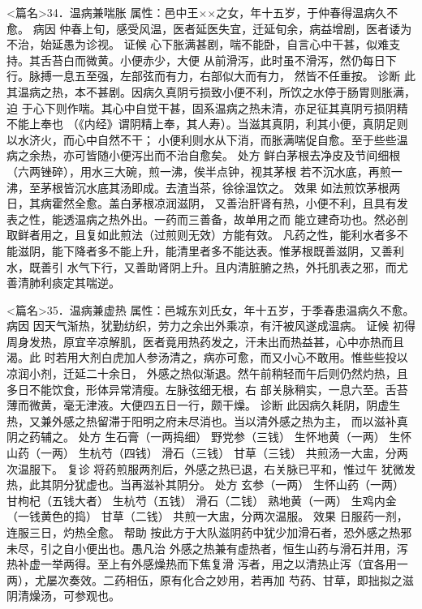 \documentclass[a4paper,12pt,UTF8,twoside]{ctexbook}
\begin{document}
<篇名>34．温病兼喘胀
属性：邑中王××之女，年十五岁，于仲春得温病久不愈。 
病因 仲春上旬，感受风温，医者延医失宜，迁延旬余，病益增剧，医者诿为不治，始延愚为诊视。 
证候 心下胀满甚剧，喘不能卧，自言心中干甚，似难支持。其舌苔白而微黄。小便赤少，大便 
从前滑泻，此时虽不滑泻，然仍每日下行。脉搏一息五至强，左部弦而有力，右部似大而有力， 
然皆不任重按。 
诊断 此其温病之热，本不甚剧。因病久真阴亏损致小便不利，所饮之水停于肠胃则胀满，迫 
于心下则作喘。其心中自觉干甚，固系温病之热未清，亦足征其真阴亏损阴精不能上奉也 
（《内经》谓阴精上奉，其人寿）。当滋其真阴，利其小便，真阴足则以水济火，而心中自然不干； 
小便利则水从下消，而胀满喘促自愈。至于些些温病之余热，亦可皆随小便泻出而不治自愈矣。 
处方 鲜白茅根去净皮及节间细根（六两锉碎），用水三大碗，煎一沸，俟半点钟，视其茅根 
若不沉水底，再煎一沸，至茅根皆沉水底其汤即成。去渣当茶，徐徐温饮之。 
效果 如法煎饮茅根两日，其病霍然全愈。盖白茅根凉润滋阴， 
又善治肝肾有热，小便不利，且具有发表之性，能透温病之热外出。一药而三善备，故单用之而 
能立建奇功也。然必剖取鲜者用之，且复如此煎法（过煎则无效）方能有效。 
凡药之性，能利水者多不 
能滋阴，能下降者多不能上升，能清里者多不能达表。惟茅根既善滋阴，又善利水，既善引 
水气下行，又善助肾阴上升。且内清脏腑之热，外托肌表之邪，而尤善清肺利痰定其喘逆。 


<篇名>35．温病兼虚热
属性：邑城东刘氏女，年十五岁，于季春患温病久不愈。 
病因 因天气渐热，犹勤纺织，劳力之余出外乘凉，有汗被风遂成温病。 
证候 初得周身发热，原宜辛凉解肌，医者竟用热药发之，汗未出而热益甚，心中亦热而且渴。此 
时若用大剂白虎加人参汤清之，病亦可愈，而又小心不敢用。惟些些投以凉润小剂，迁延二十余日， 
外感之热似渐退。然午前稍轻而午后则仍然灼热，且多日不能饮食，形体异常清瘦。左脉弦细无根，右 
部关脉稍实，一息六至。舌苔薄而微黄，毫无津液。大便四五日一行，颇干燥。 
诊断 此因病久耗阴，阴虚生热，又兼外感之热留滞于阳明之府未尽消也。当以清外感之热为主， 
而以滋补真阴之药辅之。 
处方 生石膏（一两捣细） 野党参（三钱） 生怀地黄（一两） 生怀山药（一两） 
生杭芍（四钱） 滑石（三钱） 甘草（三钱） 
共煎汤一大盅，分两次温服下。 
复诊 将药煎服两剂后，外感之热已退，右关脉已平和，惟过午 
犹微发热，此其阴分犹虚也。当再滋补其阴分。 
处方 玄参（一两） 生怀山药（一两） 甘枸杞（五钱大者） 生杭芍（五钱） 
滑石（二钱） 熟地黄（一两） 生鸡内金（一钱黄色的捣） 甘草（二钱） 
共煎一大盅，分两次温服。 
效果 日服药一剂，连服三日，灼热全愈。 
帮助 按此方于大队滋阴药中犹少加滑石者，恐外感之热邪未尽，引之自小便出也。愚凡治 
外感之热兼有虚热者，恒生山药与滑石并用，泻热补虚一举两得。至上有外感燥热而下焦复滑 
泻者，用之以清热止泻（宜各用一两），尤屡次奏效。二药相伍，原有化合之妙用，若再加 
芍药、甘草，即拙拟之滋阴清燥汤，可参观也。 
\end{document}
